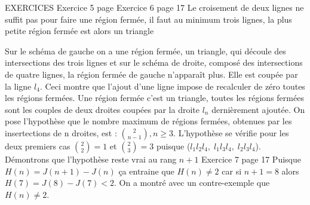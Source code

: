 \documentclass{amsart}
\begin{document}
EXERCICES\newline\newline
Exercice 5 page
Exercice 6 page 17\newline
Le croisement de deux lignes ne suffit pas pour faire une région fermée, il faut au minimum trois lignes, la plus petite région fermée est alors un triangle \newline
{}\newline
Sur le schéma de gauche on a une région fermée, un triangle, qui découle des intersections des trois lignes et sur le schéma de droite, composé des intersections de quatre lignes, la région fermée de gauche n'apparaît plus. Elle est coupée par la ligne $l_4$. Ceci montre que l'ajout d'une ligne impose de recalculer de zéro toutes les régions fermées. \newline
Une région fermée c'est un triangle, toutes les régions fermées sont les couples de deux droites coupées par la droite $l_n$ dernièrement ajoutée. \newline\newline
On pose l'hypothèse que le nombre maximum de régions fermées, obtenues  par les insertections de n droites, est :  $\binom{2}{n-1},  n\geq3$. \newline\newline
L'hypothèse se vérifie pour les deux premiers cas $\binom{2}{2} = 1$ et $\binom{2}{3} = 3$ puisque ($l_1l_2l_4,\; l_1l_3l_4,\; l_2l_3l_4$). Démontrons que l'hypothèse reste vrai au rang $n+1$
 \newline\newline
Exercice 7 page 17 \newline
Puisque $H(n) = J(n+1) - J(n)$ ça entraine que $H(n) \neq 2$ car si $n+1 = 8$ alors $H(7) = J(8) - J(7) < 2$.\newline
On a montré avec un contre-exemple que  $H(n) \neq 2$.
\end{document}
